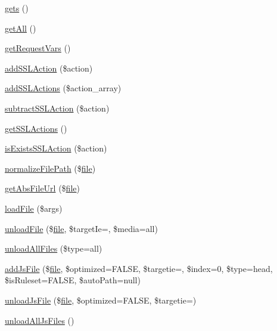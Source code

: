 \begin{DoxyCompactItemize}
\item 
\hyperlink{classContext_ae906c0b1533a8e4ce7836d3665b46288}{gets} ()
\item 
\hyperlink{classContext_a89ad6fd5c093e257e82822d16dc67ac4}{get\+All} ()
\item 
\hyperlink{classContext_a9ddbc79a7ba5892d1ea2d793f6ad52c2}{get\+Request\+Vars} ()
\item 
\hyperlink{classContext_a781f5e7a057e6f0992310318a0339ae8}{add\+S\+S\+L\+Action} (\$action)
\item 
\hyperlink{classContext_ab2acd5415515b232b7cf9f0130f4efa3}{add\+S\+S\+L\+Actions} (\$action\+\_\+array)
\item 
\hyperlink{classContext_a598cb5c571c0a1ffb15f67064e251f0d}{subtract\+S\+S\+L\+Action} (\$action)
\item 
\hyperlink{classContext_a10b68bdba6f55bc725c352aad7844dc7}{get\+S\+S\+L\+Actions} ()
\item 
\hyperlink{classContext_ada5b689e4d143f371c38091b87cfd864}{is\+Exists\+S\+S\+L\+Action} (\$action)
\item 
\hyperlink{classContext_a47a8a7878385f0d5cb7085f933157128}{normalize\+File\+Path} (\$\hyperlink{classfile}{file})
\item 
\hyperlink{classContext_a217a7ff0e32178c6a2cc761de9c88998}{get\+Abs\+File\+Url} (\$\hyperlink{classfile}{file})
\item 
\hyperlink{classContext_a01ddbd076a74f16dc46d3c7b358daea6}{load\+File} (\$args)
\item 
\hyperlink{classContext_afca3ab6519aa45494852bd474b48c03b}{unload\+File} (\$\hyperlink{classfile}{file}, \$target\+Ie=\textquotesingle{}\textquotesingle{}, \$media=\textquotesingle{}all\textquotesingle{})
\item 
\hyperlink{classContext_a9b73c566c20a2ea32cab8180957c4b6d}{unload\+All\+Files} (\$type=\textquotesingle{}all\textquotesingle{})
\item 
\hyperlink{classContext_a83f9c0b3586d76c271f80d0ce4d1ca47}{add\+Js\+File} (\$\hyperlink{classfile}{file}, \$optimized=F\+A\+L\+SE, \$targetie=\textquotesingle{}\textquotesingle{}, \$index=0, \$type=\textquotesingle{}head\textquotesingle{}, \$is\+Ruleset=F\+A\+L\+SE, \$auto\+Path=null)
\item 
\hyperlink{classContext_a5ac34d57829f0fb8e84bc476332fcf94}{unload\+Js\+File} (\$\hyperlink{classfile}{file}, \$optimized=F\+A\+L\+SE, \$targetie=\textquotesingle{}\textquotesingle{})
\item 
\hyperlink{classContext_ac8ac4c21583b50815eb01d9cc4f6405f}{unload\+All\+Js\+Files} ()

\end{DoxyCompactItemize}

